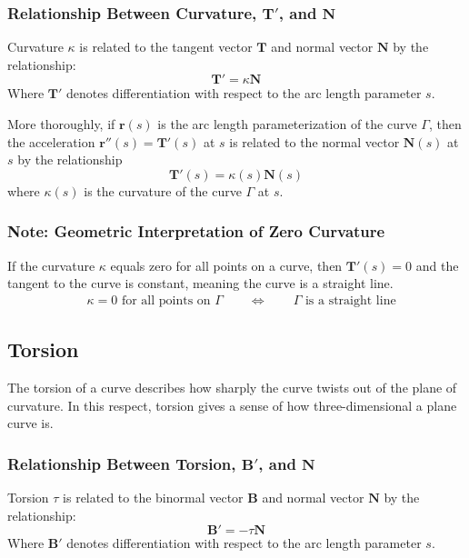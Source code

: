 \documentclass[11pt, a4paper]{article}
\begin{document}
\subsubsection{Relationship Between Curvature, $ \mathbf{T}' $, and $ \mathbf{N} $}
Curvature $ \kappa $ is related to the tangent vector $ \mathbf{T} $ and normal vector $ \mathbf{N} $ by the relationship:
\begin{equation*}
	\mathbf{T}' = \kappa \mathbf{N}
\end{equation*}
Where $	\mathbf{T}' $ denotes differentiation with respect to the arc length parameter $ s $.

More thoroughly, if $ \bm{r}(s) $ is the arc length parameterization of the curve $ \Gamma $, then the acceleration $ \bm{r}''(s) = \mathbf{T}'(s) $ at $ s $ is related to the normal vector $ \mathbf{N}(s) $ at $ s $ by the relationship
\begin{equation*}
	\mathbf{T}'(s) = \kappa(s) \mathbf{N}(s)
\end{equation*}
where $ \kappa (s) $ is the curvature of the curve $ \Gamma $ at $ s $.

\subsubsection{Note: Geometric Interpretation of Zero Curvature}
If the curvature $ \kappa $ equals zero for all points on a curve, then $ \mathbf{T}'(s) = 0 $ and the tangent to the curve is constant, meaning the curve is a straight line.
\begin{align*}
	& \kappa = 0 \text{ for all points on } \Gamma \qquad \iff \qquad \Gamma \text{ is a straight line}
\end{align*}


\subsection{Torsion}
The torsion of a curve describes how sharply the curve twists out of the plane of curvature. In this respect, torsion gives a sense of how three-dimensional a plane curve is.


\subsubsection{Relationship Between Torsion, $ \mathbf{B}' $, and $ \mathbf{N} $}
Torsion $ \tau $ is related to the binormal vector $ \mathbf{B} $ and normal vector $ \mathbf{N} $ by the relationship:
\begin{equation*}
	\mathbf{B}' = - \tau \mathbf{N}
\end{equation*}
Where $	\mathbf{B}' $ denotes differentiation with respect to the arc length parameter $ s $.
\end{document}
